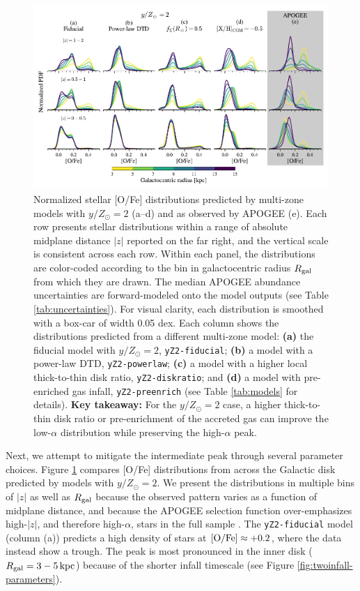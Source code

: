 \documentclass[twocolumn,twocolappendix,linenumbers]{aastex631}
\newcommand{\mathOFe}{{\rm [O/Fe]}}
\newcommand{\yZ}[1]{$y/Z_\odot=#1$}
\newcommand{\kpc}{\,{\rm kpc}}
\begin{document}
\begin{figure}
    \centering
    \includegraphics[width=\textwidth]{figures/ofe_distributions.pdf}
    \caption{Normalized stellar [O/Fe] distributions predicted by multi-zone models with \yZ{2} (a--d) and as observed by APOGEE (e). Each row presents stellar distributions within a range of absolute midplane distance $|z|$ reported on the far right, and the vertical scale is consistent across each row. Within each panel, the distributions are color-coded according to the bin in galactocentric radius $R_{\rm gal}$ from which they are drawn. The median APOGEE abundance uncertainties are forward-modeled onto the model outputs (see Table \ref{tab:uncertainties}). For visual clarity, each distribution is smoothed with a box-car of width 0.05 dex.
    Each column shows the distributions predicted from a different multi-zone model: {\bf (a)} the fiducial model with \yZ{2}, {\tt yZ2-fiducial}; {\bf (b)} a model with a power-law DTD, {\tt yZ2-powerlaw}; {\bf (c)} a model with a higher local thick-to-thin disk ratio, {\tt yZ2-diskratio}; and {\bf (d)} a model with pre-enriched gas infall, {\tt yZ2-preenrich} (see Table \ref{tab:models} for details). {\bf Key takeaway:} For the \yZ{2} case, a higher thick-to-thin disk ratio or pre-enrichment of the accreted gas can improve the low-$\alpha$ distribution while preserving the high-$\alpha$ peak.}
    \label{fig:ofe-distribution-parameters}
\end{figure}

Next, we attempt to mitigate the intermediate peak through several parameter choices. Figure \ref{fig:ofe-distribution-parameters} compares [O/Fe] distributions from across the Galactic disk predicted by models with \yZ{2}. We present the distributions in multiple bins of $|z|$ as well as $R_{\rm gal}$ because the observed pattern varies as a function of midplane distance, and because the APOGEE selection function over-emphasizes high-$|z|$, and therefore high-$\alpha$, stars in the full sample \citep[see Figure 5 from][]{vincenzo_distribution_2021}. The {\tt yZ2-fiducial} model (column (a)) predicts a high density of stars at $\mathOFe\approx+0.2$, where the data instead show a trough. The peak is most pronounced in the inner disk ($R_{\rm gal}=3-5\kpc$) because of the shorter infall timescale (see Figure \ref{fig:twoinfall-parameters}).
\end{document}
